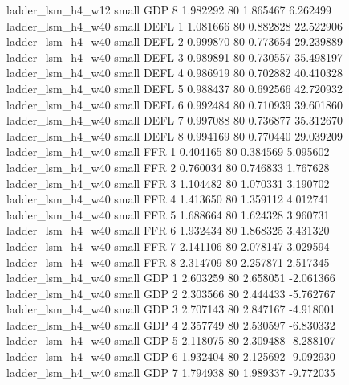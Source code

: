        ladder_lsm_h4_w12      small      GDP                 8 1.982292 80       1.865467           6.262499
       ladder_lsm_h4_w40      small     DEFL                 1 1.081666 80       0.882828          22.522906
       ladder_lsm_h4_w40      small     DEFL                 2 0.999870 80       0.773654          29.239889
       ladder_lsm_h4_w40      small     DEFL                 3 0.989891 80       0.730557          35.498197
       ladder_lsm_h4_w40      small     DEFL                 4 0.986919 80       0.702882          40.410328
       ladder_lsm_h4_w40      small     DEFL                 5 0.988437 80       0.692566          42.720932
       ladder_lsm_h4_w40      small     DEFL                 6 0.992484 80       0.710939          39.601860
       ladder_lsm_h4_w40      small     DEFL                 7 0.997088 80       0.736877          35.312670
       ladder_lsm_h4_w40      small     DEFL                 8 0.994169 80       0.770440          29.039209
       ladder_lsm_h4_w40      small      FFR                 1 0.404165 80       0.384569           5.095602
       ladder_lsm_h4_w40      small      FFR                 2 0.760034 80       0.746833           1.767628
       ladder_lsm_h4_w40      small      FFR                 3 1.104482 80       1.070331           3.190702
       ladder_lsm_h4_w40      small      FFR                 4 1.413650 80       1.359112           4.012741
       ladder_lsm_h4_w40      small      FFR                 5 1.688664 80       1.624328           3.960731
       ladder_lsm_h4_w40      small      FFR                 6 1.932434 80       1.868325           3.431320
       ladder_lsm_h4_w40      small      FFR                 7 2.141106 80       2.078147           3.029594
       ladder_lsm_h4_w40      small      FFR                 8 2.314709 80       2.257871           2.517345
       ladder_lsm_h4_w40      small      GDP                 1 2.603259 80       2.658051          -2.061366
       ladder_lsm_h4_w40      small      GDP                 2 2.303566 80       2.444433          -5.762767
       ladder_lsm_h4_w40      small      GDP                 3 2.707143 80       2.847167          -4.918001
       ladder_lsm_h4_w40      small      GDP                 4 2.357749 80       2.530597          -6.830332
       ladder_lsm_h4_w40      small      GDP                 5 2.118075 80       2.309488          -8.288107
       ladder_lsm_h4_w40      small      GDP                 6 1.932404 80       2.125692          -9.092930
       ladder_lsm_h4_w40      small      GDP                 7 1.794938 80       1.989337          -9.772035
